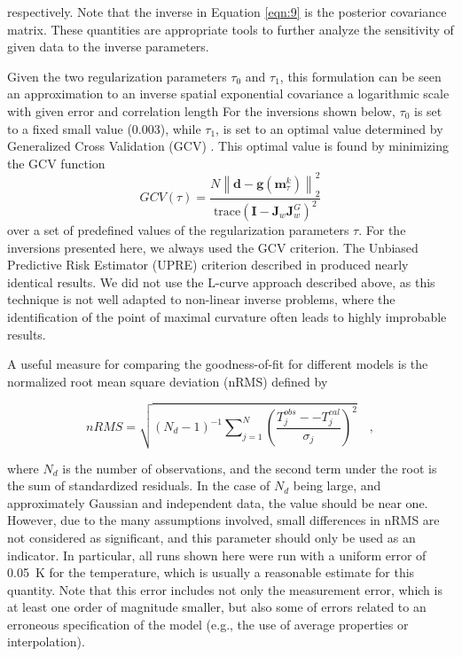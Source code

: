 \documentclass[cp]{copernicus}
\begin{document}
respectively. Note that the inverse in Equation \ref{eqn:9} is the posterior covariance matrix. 
These quantities are appropriate tools to further analyze the sensitivity of given data to the 
inverse parameters. 

Given the two regularization parameters $\tau_0$ and $\tau_1$, this formulation can be seen an 
approximation to an inverse spatial exponential covariance a logarithmic scale with given error and 
correlation length \citep{Rodgers2000a, Tarantola2005a} For the inversions shown below, $\tau_0$ is 
set to a fixed small value (0.003), while $\tau_1$, is set to an optimal value determined by 
Generalized Cross Validation (GCV) \citep{Rath2007a,Farquharson2004a,Wahba1990a}. This optimal 
value 
is found by minimizing the GCV function 
\begin{equation}\label{eqn:10}
GCV(\tau ) = \frac
{N\left\| \mathbf{d} - \mathbf{g}(\mathbf{m}_\tau ^k) \right\|_2^2}
{\text{trace}
\left(\mathbf{I} - \mathbf{J}_w^{}\mathbf{J}_w^G \right)^2} 
\end{equation} 
\noindent over a set of predefined values of the regularization parameters $\tau$. For the 
inversions presented here, we always used the GCV criterion. The Unbiased Predictive Risk Estimator 
(UPRE) criterion described in \citet{Vogel2002a} produced nearly identical results. We did not use 
the L-curve approach described above, as this technique is not well adapted to non-linear inverse 
problems, where the identification of the point of maximal curvature often leads to highly 
improbable results. 

A useful measure for comparing the goodness-of-fit for different models is the normalized root mean 
square deviation (nRMS) defined by
 
\begin{equation}\label{eqn:11}
nRMS = \sqrt {\left( {{N_d} - 1} \right)_{}^{ - 1}\sum\nolimits_{j = 1}^N 
{{{\left( {\frac{{T_j^{obs}--T_j^{cal}}}{{{\sigma _j}}}} \right)}^2}} } \quad ,
\end{equation} 

where $N_d$ is the number of observations, and the second term under the root is the sum of 
standardized residuals. In the case of $N_d$ being large, and approximately Gaussian and independent 
data, the value should be near one. However, due to the many assumptions involved, small 
differences in nRMS are not considered as significant, and this parameter should only be used as an 
indicator. In particular, all runs shown here were run with a uniform error of 0.05~K for the 
temperature, which is usually a reasonable estimate for this quantity. Note that this error includes 
not only the measurement error, which is at least one order of magnitude smaller, but also some of 
errors related to an erroneous specification of the model (e.g., the use of average properties or 
interpolation). 
\end{document}
